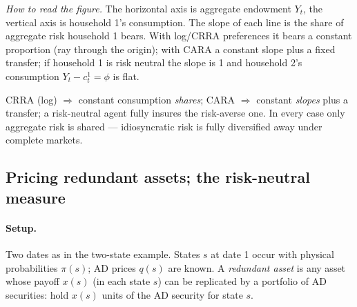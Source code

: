 \begin{center}
\end{center}
\emph{How to read the figure.} The horizontal axis is aggregate endowment $Y_t$, the vertical axis is household 1's consumption. The slope of each line is the share of aggregate risk household 1 bears. With log/CRRA preferences it bears a constant proportion (ray through the origin); with CARA a constant slope plus a fixed transfer; if household 1 is risk neutral the slope is 1 and household 2's consumption $Y_t-c^1_t=\phi$ is flat.

\begin{tipbox}
CRRA (log) $\Rightarrow$ constant consumption \emph{shares}; CARA $\Rightarrow$ constant \emph{slopes} plus a transfer; a risk-neutral agent fully insures the risk-averse one. In every case only aggregate risk is shared --- idiosyncratic risk is fully diversified away under complete markets.
\end{tipbox}

\subsection{Pricing redundant assets; the risk-neutral measure }

\paragraph{Setup.} Two dates as in the two-state example. States $s$ at date 1 occur with physical probabilities $\pi(s)$; AD prices $q(s)$ are known. A \emph{redundant asset} is any asset whose payoff $x(s)$ (in each state $s$) can be replicated by a portfolio of AD securities: hold $x(s)$ units of the AD security for state $s$.

